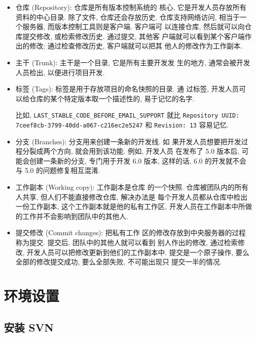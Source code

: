 \documentclass[nofonts, oneside]{ctexbook}
\begin{document}
\begin{itemize}
  \item 仓库 (Repository): 仓库是所有版本控制系统的
      核心, 它是开发人员存放所有资料的中心目录. 除了文件, 仓库还会存放历史.
      仓库支持网络访问, 相当于一个服务器, 而版本控制工具则是客户端. 客户端可
      以连接仓库, 然后就可以向仓库提交修改, 或检索修改历史. 通过提交, 其他客
      户端就可以看到某个客户端作出的修改; 通过检查修改历史, 客户端就可以把其
      他人的修改作为工作副本.

  \item 主干 (Trunk): 主干是一个目录, 它是所有主要开发发
      生的地方, 通常会被开发人员检出, 以便进行项目开发.

  \item 标签 (Tags): 标签是用于存放项目的命名快照的目录. 通
      过标签, 开发人员可以给仓库的某个特定版本取一个描述性的, 易于记忆的名字.

      比如, \texttt{LAST\_STABLE\_CODE\_BEFORE\_EMAIL\_SUPPORT} 就比
      \texttt{Repository UUID: 7ceef8cb-3799-40dd-a067-c216ec2e5247} 和
      \texttt{Revision: 13} 容易记忆.

  \item 分支 (Branches): 分支用来创建一条新的开发线. 如
      果开发人员想要把开发过程分裂成两个方向, 就会用到该功能. 例如, 开发人员
      在发布了 5.0 版本后, 可能会创建一条新的分支, 专门用于开发 6.0 版本,
      这样的话, 6.0 的开发就不会与 5.0 的问题修复相互混淆.

  \item 工作副本 (Working copy): 工作副本是仓库
      的一个快照. 仓库被团队内的所有人共享, 但人们不能直接修改仓库, 解决办法是
      每个开发人员都从仓库中检出一份工作副本, 这个工作副本就是他的私有工作区,
      开发人员在工作副本中所做的工作并不会影响到团队中的其他人.

  \item 提交修改 (Commit changes): 把私有工作
      区的修改存放到中央服务器的过程称为提交. 提交后, 团队中的其他人就可以看到
      别人作出的修改, 通过检索修改, 开发人员可以把修改更新到他们的工作副本中.
      提交是一个原子操作, 要么全部的修改提交成功, 要么全部失败, 不可能出现只
      提交一半的情况.
\end{itemize}

\chapter{环境设置}
\label{chap:environment_setup}

\section{安装 SVN}
\label{sec:svn_installation}
\end{document}
